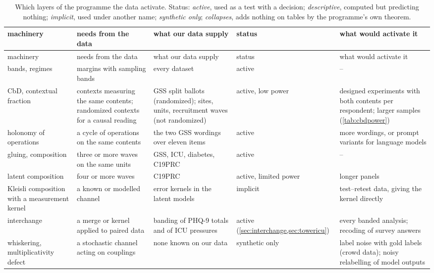 \documentclass[11pt]{article}
\theoremstyle{definition}
\theoremstyle{remark}
\begin{document}
{\footnotesize
\setlength{\tabcolsep}{3pt}
\begin{longtable}{>{\raggedright}p{2.6cm}>{\raggedright}p{3.4cm}>{\raggedright}p{3.2cm}>{\raggedright}p{1.9cm}>{\raggedright\arraybackslash}p{4.0cm}}
\caption{Which layers of the programme the data activate. Status: \emph{active}, used as a test with a decision; \emph{descriptive},
computed but predicting nothing; \emph{implicit}, used under another name; \emph{synthetic only}; \emph{collapses}, adds nothing on tables by
the programme's own theorem.}\label{tab:activation}\\
\toprule
machinery & needs from the data & what our data supply & status & what would activate it\\
\midrule\endfirsthead
\toprule machinery & needs from the data & what our data supply & status & what would activate it\\\midrule\endhead
\bottomrule\endfoot
bands, regimes \cite{Bands} & margins with sampling bands & every dataset & active & --\\
CbD, contextual fraction \cite{Bridges} & contexts measuring the same contents; randomized contexts for a causal reading & GSS split ballots (randomized); sites, units, recruitment waves (not randomized) & active, low power & designed experiments with both contents per respondent; larger samples (\cref{tab:cbdpower})\\
holonomy of operations \cite{ThreeLayers} & a cycle of operations on the same contents & the two GSS wordings over eleven items & active & more wordings, or prompt variants for language models\\
gluing, composition \cite{Conditionals} & three or more waves on the same units & GSS, ICU, diabetes, C19PRC & active & --\\
latent composition & four or more waves & C19PRC & active, limited power & longer panels\\
Kleisli composition with a measurement kernel & a known or modelled channel & error kernels in the latent models & implicit & test--retest data, giving the kernel directly\\
interchange \cite[Prop.~6.1]{Algebras} & a merge or kernel applied to paired data & banding of PHQ-9 totals and of ICU pressures & active (\cref{sec:interchange,sec:towericu}) & every banded analysis; recoding of survey answers\\
whiskering, multiplicativity defect \cite{Bands,Conditionals} & a stochastic channel acting on couplings & none known on our data & synthetic only & label noise with gold labels (crowd data); noisy relabelling of model outputs\\

\end{longtable}}
\end{document}
